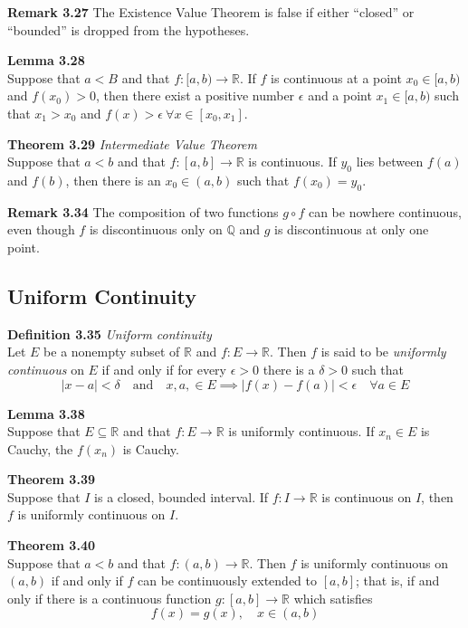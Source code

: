 \documentclass[8pt,landscape]{article}
\begin{document}
\begin{multicols}{3}
    \textbf{Remark 3.27}
    The Existence Value Theorem is false if either ``closed'' or ``bounded'' is dropped
    from the hypotheses.

    \textbf{Lemma 3.28} \\
    Suppose that $a < B$ and that $f : [a, b) \to \mathbb{R}$.
    If $f$ is continuous at a point $x_0 \in [a,b)$ and $f(x_0) > 0$,
    then there exist a positive number $\epsilon$ and a point
    $x_1 \in [a, b)$ such that $x_1 > x_0$ and $f(x) > \epsilon \ \forall
    x \in [x_0, x_1]$.

    \textbf{Theorem 3.29} \emph{Intermediate Value Theorem} \\
    Suppose that $a < b$ and that $f : [a, b] \to \mathbb{R}$ is continuous.
    If $y_0$ lies between $f(a)$ and $f(b)$, then there is an $x_0 \in (a, b)$
    such that $f(x_0) = y_0$.

    \textbf{Remark 3.34}
    The composition of two functions $g \circ f$ can be nowhere continuous,
    even though $f$ is discontinuous only on $\mathbb{Q}$ and $g$ is discontinuous
    at only one point.

    \subsection{Uniform Continuity}

    \textbf{Definition 3.35} \emph{Uniform continuity} \\
    Let $E$ be a nonempty subset of $\mathbb{R}$ and $f : E \to \mathbb{R}$.
    Then $f$ is said to be \emph{uniformly continuous} on $E$ if and only if
    for every $\epsilon > 0$ there is a $\delta > 0$ such that
    \[
        |x-a| < \delta \quad \text{and} \quad x, a, \in E \implies |f(x) - f(a)| < \epsilon \quad \forall a \in E
    \]

    \textbf{Lemma 3.38} \\
    Suppose that $E \subseteq \mathbb{R}$ and that $f : E \to \mathbb{R}$
    is uniformly continuous.
    If $x_n \in E$ is Cauchy, the $f(x_n)$ is Cauchy.

    \textbf{Theorem 3.39} \\
    Suppose that $I$ is a closed, bounded interval.
    If $f : I \to \mathbb{R}$ is continuous on $I$, then $f$ is uniformly continuous on
    $I$.

    \textbf{Theorem 3.40} \\
    Suppose that $a < b$ and that $f : (a, b) \to \mathbb{R}$.
    Then $f$ is uniformly continuous on $(a, b)$ if and only if $f$ can be continuously
    extended to $[a, b]$; that is, if and only if there is a continuous function
    $g : [a, b] \to \mathbb{R}$ which satisfies
    \[
        f(x) = g(x), \quad x \in (a, b)
    \]


\end{multicols}
\end{document}
